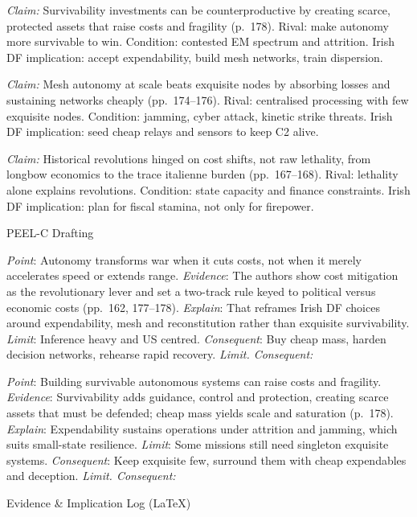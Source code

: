 \textit{Claim:} Survivability investments can be counterproductive by creating scarce, protected assets that raise costs and fragility (p.~178). Rival: make autonomy more survivable to win. Condition: contested EM spectrum and attrition. Irish DF implication: accept expendability, build mesh networks, train dispersion.

\textit{Claim:} Mesh autonomy at scale beats exquisite nodes by absorbing losses and sustaining networks cheaply (pp.~174–176). Rival: centralised processing with few exquisite nodes. Condition: jamming, cyber attack, kinetic strike threats. Irish DF implication: seed cheap relays and sensors to keep C2 alive.

\textit{Claim:} Historical revolutions hinged on cost shifts, not raw lethality, from longbow economics to the trace italienne burden (pp.~167–168). Rival: lethality alone explains revolutions. Condition: state capacity and finance constraints. Irish DF implication: plan for fiscal stamina, not only for firepower.

PEEL-C Drafting

\textit{Point}: Autonomy transforms war when it cuts costs, not when it merely accelerates speed or extends range.
\textit{Evidence}: The authors show cost mitigation as the revolutionary lever and set a two-track rule keyed to political versus economic costs (pp.~162, 177–178).
\textit{Explain}: That reframes Irish DF choices around expendability, mesh and reconstitution rather than exquisite survivability.
\textit{Limit}: Inference heavy and US centred.
\textit{Consequent}: Buy cheap mass, harden decision networks, rehearse rapid recovery.
\textit{Limit. Consequent:}

\textit{Point}: Building survivable autonomous systems can raise costs and fragility.
\textit{Evidence}: Survivability adds guidance, control and protection, creating scarce assets that must be defended; cheap mass yields scale and saturation (p.~178).
\textit{Explain}: Expendability sustains operations under attrition and jamming, which suits small-state resilience.
\textit{Limit}: Some missions still need singleton exquisite systems.
\textit{Consequent}: Keep exquisite few, surround them with cheap expendables and deception.
\textit{Limit. Consequent:}

Evidence & Implication Log (LaTeX)

